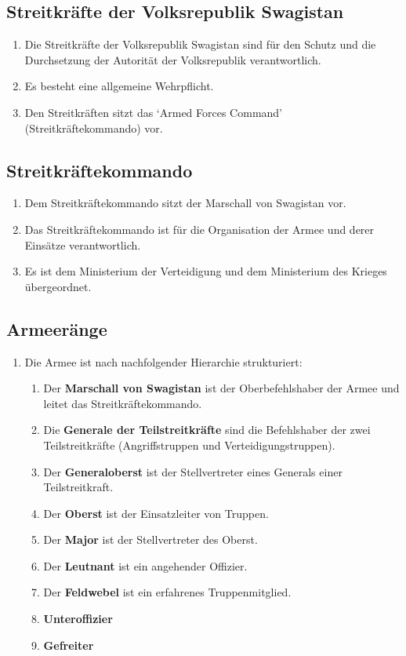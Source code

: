 \documentclass{article}
\begin{document}
\subsection{Streitkräfte der Volksrepublik Swagistan}
\begin{enumerate}[(1)]
    \item Die Streitkräfte der Volksrepublik Swagistan sind für den Schutz und die Durchsetzung der Autorität der Volksrepublik verantwortlich.
    \item Es besteht eine allgemeine Wehrpflicht.
    \item Den Streitkräften sitzt das `Armed Forces Command' (Streitkräftekommando) vor.
\end{enumerate}

\subsection{Streitkräftekommando}
\begin{enumerate}[(1)]
    \item Dem Streitkräftekommando sitzt der Marschall von Swagistan vor.
    \item Das Streitkräftekommando ist für die Organisation der Armee und derer Einsätze verantwortlich.
    \item Es ist dem Ministerium der Verteidigung und dem Ministerium des Krieges übergeordnet.
\end{enumerate}

\subsection{Armeeränge}
\begin{enumerate}[(1)]
    \item Die Armee ist nach nachfolgender Hierarchie strukturiert:
    \begin{enumerate}[1.]
        \item Der \textbf{Marschall von Swagistan} ist der Oberbefehlshaber der Armee und leitet das Streitkräftekommando.
        \item Die \textbf{Generale der Teilstreitkräfte} sind die Befehlshaber der zwei Teilstreitkräfte (Angriffstruppen und Verteidigungstruppen).
        \item Der \textbf{Generaloberst} ist der Stellvertreter eines Generals einer Teilstreitkraft.
        \item Der \textbf{Oberst} ist der Einsatzleiter von Truppen.
        \item Der \textbf{Major} ist der Stellvertreter des Oberst.
        \item Der \textbf{Leutnant} ist ein angehender Offizier.
        \item Der \textbf{Feldwebel} ist ein erfahrenes Truppenmitglied.
        \item \textbf{Unteroffizier}
        \item \textbf{Gefreiter}
    \end{enumerate}
\end{enumerate}
\end{document}
